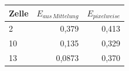 \begin{center}
    \centering
    \begin{tabular}{l|r|r}
        Zelle & $E_{aus \, Mittelung}$ & $E_{pixelweise}$\\
        \hline
        2 & 0,379 & 0,413\\
        10 & 0,135 & 0,329\\
        13 & 0,0873 & 0,370\\
    \end{tabular}
    \label{tab:VerglE}
\end{center}

\clearpage